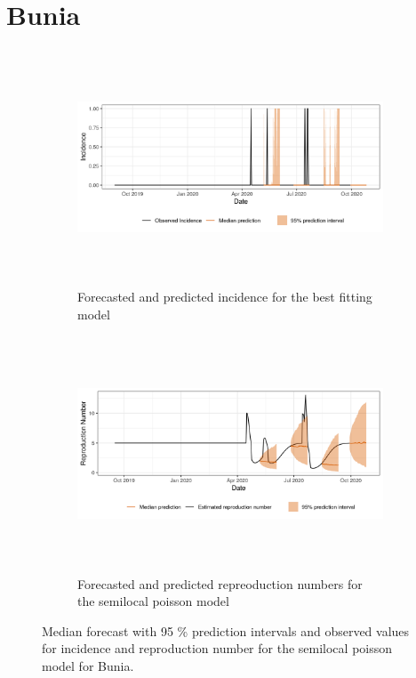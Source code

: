 \section{ Bunia }\begin{figure}[H]\begin{subfigure}{\textwidth}  \centering  \includegraphics[width=0.9\linewidth, height=7cm]{../output/Bunia_predictions.png}  \caption{Forecasted and predicted incidence for the best fitting model}\end{subfigure}

\begin{subfigure}{\textwidth}  \centering  \includegraphics[width=0.9\linewidth, height=7cm]{../output/Bunia_Rs.png}  \caption{Forecasted and predicted repreoduction numbers for the semilocal poisson model}\end{subfigure}  \caption{Median forecast with 95 \% prediction intervals and observed values for incidence and reproduction number for the semilocal poisson model for Bunia.}\end{figure}

